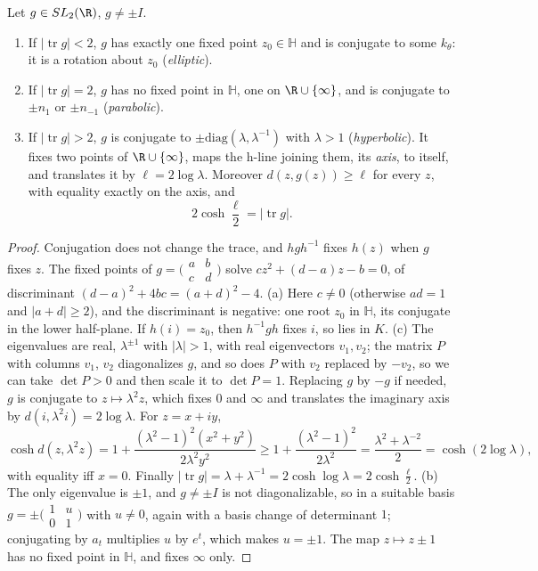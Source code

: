 \begin{theorem}\label{thm:trace}
Let $g\in SL_2(\R)$, $g\neq\pm I$.
\begin{enumerate}
\item[(a)] If $|\operatorname{tr}g|<2$, $g$ has exactly one fixed point $z_0\in\mathbb H$ and is conjugate to some $k_\theta$: it is a rotation about $z_0$ (\emph{elliptic}).
\item[(b)] If $|\operatorname{tr}g|=2$, $g$ has no fixed point in $\mathbb H$, one on $\R\cup\{\infty\}$, and is conjugate to $\pm n_1$ or $\pm n_{-1}$ (\emph{parabolic}).
\item[(c)] If $|\operatorname{tr}g|>2$, $g$ is conjugate to $\pm\mathrm{diag}(\lambda,\lambda^{-1})$ with $\lambda>1$ (\emph{hyperbolic}). It fixes two points of $\R\cup\{\infty\}$, maps the h-line joining them, its
\emph{axis}, to itself, and translates it by $\ell=2\log\lambda$. Moreover $d(z,g(z))\ge\ell$ for every $z$, with equality exactly on the axis, and
\[2\cosh\frac\ell2=|\operatorname{tr}g|.\]
\end{enumerate}
\end{theorem}

\begin{proof}
Conjugation does not change the trace, and $hgh^{-1}$ fixes $h(z)$ when $g$ fixes $z$. The fixed points of $g=\bigl(\begin{smallmatrix}a&b\\c&d\end{smallmatrix}\bigr)$ solve $cz^2+(d-a)z-b=0$, of
discriminant $(d-a)^2+4bc=(a+d)^2-4$. (a) Here $c\ne0$ (otherwise $ad=1$ and $|a+d|\ge2$), and the discriminant is negative: one root $z_0$ in $\mathbb H$, its conjugate in the lower half-plane.
If $h(i)=z_0$, then $h^{-1}gh$ fixes $i$, so lies in $K$. (c) The eigenvalues are real, $\lambda^{\pm1}$ with $|\lambda|>1$, with real eigenvectors $v_1,v_2$; the matrix $P$ with columns $v_1$, $v_2$
diagonalizes $g$, and so does $P$ with $v_2$ replaced by $-v_2$, so we can take $\det P>0$ and then scale it to $\det P=1$. Replacing $g$ by $-g$ if needed, $g$ is conjugate to $z\mapsto\lambda^2z$, which fixes $0$ and
$\infty$ and translates the imaginary axis by $d(i,\lambda^2i)=2\log\lambda$. For $z=x+iy$,
\[\cosh d(z,\lambda^2z)=1+\frac{(\lambda^2-1)^2(x^2+y^2)}{2\lambda^2y^2}\ge1+\frac{(\lambda^2-1)^2}{2\lambda^2}=\frac{\lambda^2+\lambda^{-2}}2=\cosh(2\log\lambda),\]
with equality iff $x=0$. Finally $|\operatorname{tr}g|=\lambda+\lambda^{-1}=2\cosh\log\lambda=2\cosh\frac\ell2$. (b) The only eigenvalue is $\pm1$, and $g\ne\pm I$ is not diagonalizable, so in a suitable basis
$g=\pm\bigl(\begin{smallmatrix}1&u\\0&1\end{smallmatrix}\bigr)$ with $u\ne0$, again with a basis change of determinant $1$; conjugating by $a_t$ multiplies $u$ by $e^t$, which makes $u=\pm1$. The map $z\mapsto z\pm1$ has no fixed
point in $\mathbb H$, and fixes $\infty$ only.
\end{proof}

